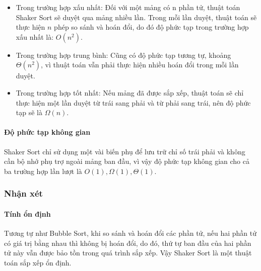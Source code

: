 \begin{itemize}
    \item Trong trường hợp xấu nhất: Đối với một mảng có n phần tử, thuật toán Shaker Sort sẽ duyệt qua mảng nhiều lần. Trong mỗi lần duyệt, thuật toán sẽ thực hiện $n$ phép so sánh và hoán đổi, do đó độ phức tạp trong trường hợp xấu nhất là: $O(n^2)$.
    \item Trong trường hợp trung bình: Cũng có độ phức tạp tương tự, khoảng $\Theta(n^2)$, vì thuật toán vẫn phải thực hiện nhiều hoán đổi trong mỗi lần duyệt.
    \item Trong trường hợp tốt nhất: Nếu mảng đã được sắp xếp, thuật toán sẽ chỉ thực hiện một lần duyệt từ trái sang phải và từ phải sang trái, nên độ phức tạp sẽ là $\Omega(n)$.
\end{itemize}

\paragraph{Độ phức tạp không gian}

Shaker Sort chỉ sử dụng một vài biến phụ để lưu trữ chỉ số trái phải và không cần bộ nhớ phụ trợ ngoài mảng ban đầu, vì vậy độ phức tạp không gian cho cả ba trường hợp lần lượt là $O(1), \Omega(1), \Theta(1)$.

\subsubsection{Nhận xét}

\paragraph{Tính ổn định} Tương tự như Bubble Sort, khi so sánh và hoán đổi các phần tử, nếu hai phần tử có giá trị bằng nhau thì không bị hoán đổi, do đó, thứ tự ban đầu của hai phần tử này vẫn được bảo tồn trong quá trình sắp xếp. Vậy Shaker Sort là một thuật toán sắp xếp ổn định.


